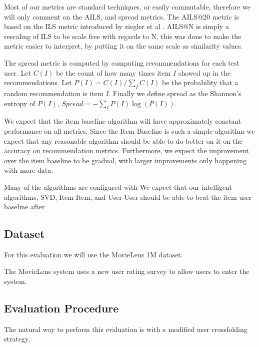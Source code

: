 \documentclass[letterpaper]{sig-alternate}
\begin{document}
  Most of our metrics are standard techniques, or easily commutable, therefore we will only comment on the AILS, and spread metrics.
  The AILS@20 metric is based on the ILS metric introduced by ziegler et al \cite{ziegler}.
  AILS@N is simply a rescaling of ILS to be scale free with regards to N, this was done to make the metric easier to interpret, by putting it on the same scale as similarity values.
 
  The spread metric is computed by computing recommendations for each test user.
  Let $C(I)$ be the count of how many times item $I$ showed up in the recommendations.
  Let $P(I) = C(I) / \sum_I C(I)$ be the probability that a random recommendation is item $I$.
  Finally we define spread as the Shannon's entropy of $P(I)$, $Spread = -\sum_I P(I) \log(P(I))$.

  We expect that the item baseline algorithm will have approximately constant performance on all metrics.
  Since the Item Baseline is such a simple algorithm we expect that any reasonable algorithm should be able to do better on it on the accuracy on recommendation metrics.
  Furthermore, we expect the improvement over the item baseline to be gradual, with larger improvements only happening with more data.
  
  Many of the algorithms are configured with 
  We expect that our intelligent algorithms, SVD, Item-Item, and User-User should be able to beat the item user baseline after 
  
  \subsection*{Dataset}
  For this evaluation we will use the MovieLens 1M dataset.

  The MovieLens system uses a new user rating survey to allow users to enter the system.
  
  \subsection*{Evaluation Procedure}
  The natural way to perform this evaluation is with a modified user crossfolding strategy.
  
\end{document}
